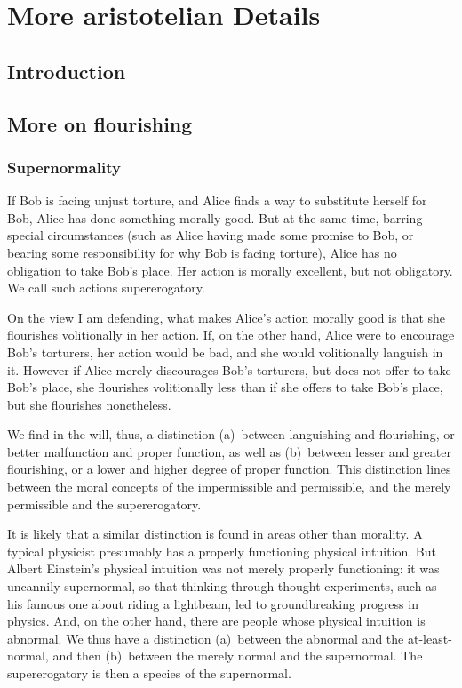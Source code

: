 \def\mychapter{XI}

\chapter{More aristotelian Details}\label{ch:details}
\section{Introduction}
\section{More on flourishing}
\subsection{Supernormality}
If Bob is facing unjust torture, and Alice finds a way to substitute herself for Bob, 
Alice has done something morally good. But at the same time, barring special circumstances
(such as Alice having made some promise to Bob, or bearing some responsibility for why
Bob is facing torture), Alice has no obligation to take Bob's place. Her action is morally
excellent, but not obligatory. We call such actions supererogatory.

On the view I am defending, what makes Alice's action morally good is that she 
flourishes volitionally in her action. If, on the other hand, Alice were to encourage Bob's 
torturers, her action would be bad, and she would volitionally languish in it. However if Alice
merely discourages Bob's torturers, but does not offer to take Bob's place, she flourishes
volitionally less than if she offers to take Bob's place, but she flourishes nonetheless.

We find in the will, thus, a distinction (a)~between languishing and flourishing, or 
better malfunction and proper function, as well as (b)~between lesser and greater flourishing,
or a lower and higher degree of proper function. This distinction lines between the moral concepts of
the impermissible and permissible, and the merely permissible and the supererogatory. 

It is likely that a similar distinction is found in areas other than morality. A typical
physicist presumably has a properly functioning physical intuition. But Albert Einstein's physical 
intuition was not merely properly functioning: it was uncannily supernormal, so that thinking through
thought experiments, such as his famous one about riding a lightbeam, led to groundbreaking
progress in physics. And, on the other hand, there are people whose physical intuition is
abnormal. We thus have a distinction (a)~between the abnormal and the at-least-normal, and then
(b)~between the merely normal and the supernormal. The supererogatory is then a species of the
supernormal.

